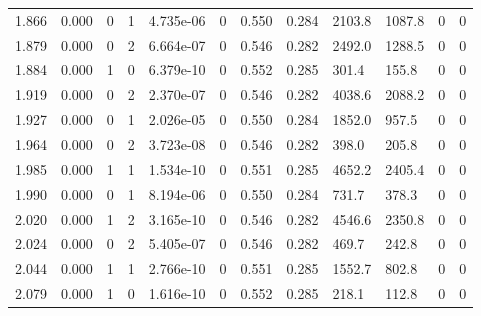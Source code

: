 \documentclass[preview]{standalone}
\begin{document}
{{{\begin{tabular}{L{1.2cm}C{1.2cm} C{0.3cm}C{0.5cm} C{1.4cm}C{1.4cm} C{1.4cm}C{1.4cm} C{1.6cm}C{1.6cm} C{1.6cm}C{1.6cm}}
  1.866  &  0.000  & 0     &  1 &  4.735e-06  & 0  &  0.550&   0.284& 2103.8 & 1087.8   &  0 & 0  \\ 
  1.879  &  0.000  & 0     &  2 &  6.664e-07  & 0  &  0.546&   0.282& 2492.0 & 1288.5   &  0 & 0  \\ 
  1.884  &  0.000  & 1     &  0 &  6.379e-10  & 0  &  0.552&   0.285& 301.4 & 155.8   &  0 & 0  \\ 
  1.919  &  0.000  & 0     &  2 &  2.370e-07  & 0  &  0.546&   0.282& 4038.6 & 2088.2   &  0 & 0  \\ 
  1.927  &  0.000  & 0     &  1 &  2.026e-05  & 0  &  0.550&   0.284& 1852.0 & 957.5   &  0 & 0  \\ 
  1.964  &  0.000  & 0     &  2 &  3.723e-08  & 0  &  0.546&   0.282& 398.0 & 205.8   &  0 & 0  \\ 
  1.985  &  0.000  & 1     &  1 &  1.534e-10  & 0  &  0.551&   0.285& 4652.2 & 2405.4   &  0 & 0  \\ 
  1.990  &  0.000  & 0     &  1 &  8.194e-06  & 0  &  0.550&   0.284& 731.7 & 378.3   &  0 & 0  \\ 
  2.020  &  0.000  & 1     &  2 &  3.165e-10  & 0  &  0.546&   0.282& 4546.6 & 2350.8   &  0 & 0  \\ 
  2.024  &  0.000  & 0     &  2 &  5.405e-07  & 0  &  0.546&   0.282& 469.7 & 242.8   &  0 & 0  \\ 
  2.044  &  0.000  & 1     &  1 &  2.766e-10  & 0  &  0.551&   0.285& 1552.7 & 802.8   &  0 & 0  \\ 
  2.079  &  0.000  & 1     &  0 &  1.616e-10  & 0  &  0.552&   0.285& 218.1 & 112.8   &  0 & 0  \\ 
\hline 
\end{tabular} 

}}}
\end{document}
